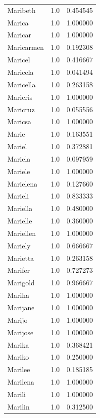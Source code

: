 \documentclass[
  letterpaper,
  DIV=11,
  numbers=noendperiod]{scrreprt}
\begin{document}
\begin{tabular}{lrr}
Maribeth        &   1.0 &   0.454545 \\
Marica          &   1.0 &   1.000000 \\
Maricar         &   1.0 &   1.000000 \\
Maricarmen      &   1.0 &   0.192308 \\
Maricel         &   1.0 &   0.416667 \\
Maricela        &   1.0 &   0.041494 \\
Maricella       &   1.0 &   0.263158 \\
Maricris        &   1.0 &   1.000000 \\
Maricruz        &   1.0 &   0.055556 \\
Maricsa         &   1.0 &   1.000000 \\
Marie           &   1.0 &   0.163551 \\
Mariel          &   1.0 &   0.372881 \\
Mariela         &   1.0 &   0.097959 \\
Mariele         &   1.0 &   1.000000 \\
Marielena       &   1.0 &   0.127660 \\
Marieli         &   1.0 &   0.833333 \\
Mariella        &   1.0 &   0.480000 \\
Marielle        &   1.0 &   0.360000 \\
Mariellen       &   1.0 &   1.000000 \\
Mariely         &   1.0 &   0.666667 \\
Marietta        &   1.0 &   0.263158 \\
Marifer         &   1.0 &   0.727273 \\
Marigold        &   1.0 &   0.966667 \\
Mariha          &   1.0 &   1.000000 \\
Marijane        &   1.0 &   1.000000 \\
Marijo          &   1.0 &   1.000000 \\
Marijose        &   1.0 &   1.000000 \\
Marika          &   1.0 &   0.368421 \\
Mariko          &   1.0 &   0.250000 \\
Marilee         &   1.0 &   0.185185 \\
Marilena        &   1.0 &   1.000000 \\
Marili          &   1.0 &   1.000000 \\
Marilin         &   1.0 &   0.312500 \\

\end{tabular}
\end{document}
